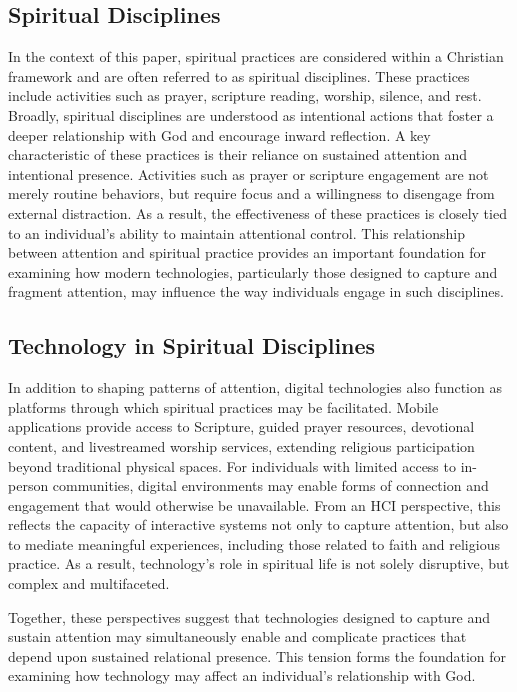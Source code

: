 \documentclass[12pt]{article}
\begin{document}
\subsection{Spiritual Disciplines}
In the context of this paper, spiritual practices are considered within a Christian framework and are often referred to as spiritual disciplines. These practices include activities such as prayer, scripture reading, worship, silence, and rest. Broadly, spiritual disciplines are understood as intentional actions that foster a deeper relationship with God and encourage inward reflection. A key characteristic of these practices is their reliance on sustained attention and intentional presence. Activities such as prayer or scripture engagement are not merely routine behaviors, but require focus and a willingness to disengage from external distraction. As a result, the effectiveness of these practices is closely tied to an individual's ability to maintain attentional control. This relationship between attention and spiritual practice provides an important foundation for examining how modern technologies, particularly those designed to capture and fragment attention, may influence the way individuals engage in such disciplines.
\subsection{Technology in Spiritual Disciplines}
In addition to shaping patterns of attention, digital technologies also function as platforms through which spiritual practices may be facilitated. Mobile applications provide access to Scripture, guided prayer resources, devotional content, and livestreamed worship services, extending religious participation beyond traditional physical spaces\cite{10.1145/3491101.3519856}. For individuals with limited access to in-person communities, digital environments may enable forms of connection and engagement that would otherwise be unavailable. From an HCI perspective, this reflects the capacity of interactive systems not only to capture attention, but also to mediate meaningful experiences, including those related to faith and religious practice. As a result, technology's role in spiritual life is not solely disruptive, but complex and multifaceted.

Together, these perspectives suggest that technologies designed to capture and sustain attention may simultaneously enable and complicate practices that depend upon sustained relational presence. This tension forms the foundation for examining how technology may affect an individual's relationship with God. 
\end{document}

